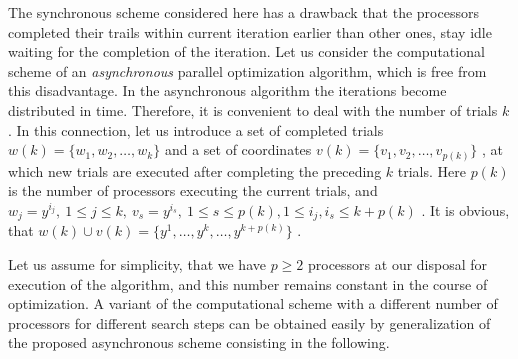 The synchronous scheme considered here has a drawback that the processors completed their trails within current iteration earlier than other ones, stay idle waiting for the completion of the iteration. Let us consider the computational scheme of an \textit{asynchronous} parallel optimization algorithm, which is free from this disadvantage. In the asynchronous algorithm the iterations become distributed in time. Therefore, it is convenient to deal with the number of trials $k$. In this connection, let us introduce a set of completed trials  $w(k)=\{w_1,w_2,\ldots,w_k\}$  and a set  of coordinates $v(k)=\{v_1,v_2,\ldots,v_{p(k)}\}$ , at which new trials are executed after completing the preceding $k$ trials. Here $p(k)$ is the number of processors executing the current trials, and $w_j=y^{i_j},\ 1\leq j\leq k,\ v_s=y^{i_s},\ 1\leq s\leq p(k), 1\leq i_j,i_s \leq k+p(k)$ . It is obvious, that $w(k)\cup v(k)=\{y^1,\ldots,y^k,\ldots,y^{k+p(k)}\}$ .

Let us assume for simplicity, that we have  $p\geq 2$  processors at our disposal for execution of the algorithm, and this number remains constant in the course of optimization. A variant of the computational scheme with a different number of processors for different search steps can be obtained easily by generalization of the proposed asynchronous scheme consisting in the following.
